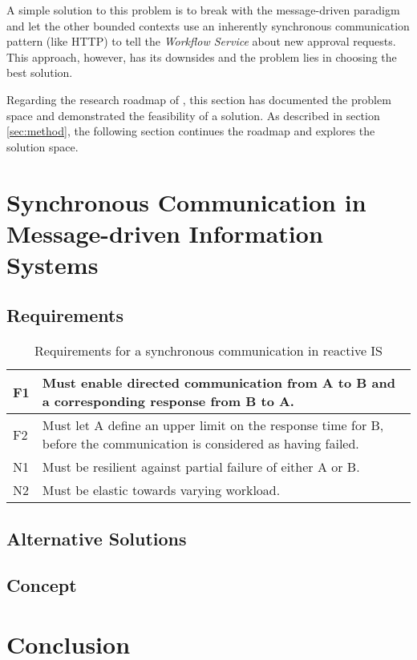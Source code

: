 A simple solution to this problem is to break with the message-driven paradigm and let the other bounded contexts use an inherently synchronous communication pattern (like HTTP) to tell the \emph{Workflow Service} about new approval requests.
This approach, however, has its downsides and the problem lies in choosing the best solution.

Regarding the research roadmap of \cite[]{alturki_design_2011}, this section has documented the problem space and demonstrated the feasibility of a solution.
As described in section \ref{sec:method}, the following section continues the roadmap and explores the solution space.

\clearpage
\section{Synchronous Communication in Message-driven Information Systems}\label{sec:concept}

\subsection{Requirements}

\begin{table}[ht]
  \begin{tabu}{| l | X |}
    \hline
    F1 & Must enable directed communication from A to B and a corresponding response from B to A.                              \\
    \hline
    F2 & Must let A define an upper limit on the response time for B, before the communication is considered as having failed. \\
    \hline
    N1 & Must be resilient against partial failure of either A or B.                                                           \\
    \hline
    N2 & Must be elastic towards varying workload.                                                                             \\
    \hline
  \end{tabu}
  \caption[short]{Requirements for a synchronous communication in reactive IS}\label{tab:requirements}
\end{table}

\subsection{Alternative Solutions}

\subsection{Concept}


\clearpage
\section{Conclusion}\label{sec:conclusion}
